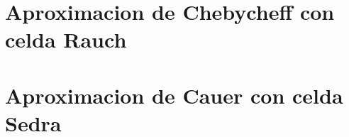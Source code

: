 







\tableofcontents
\newpage

\section{Aproximacion de Chebycheff con celda Rauch}
		
	\newpage	

\section{Aproximacion de Cauer con celda Sedra}
		
	\newpage	
	
